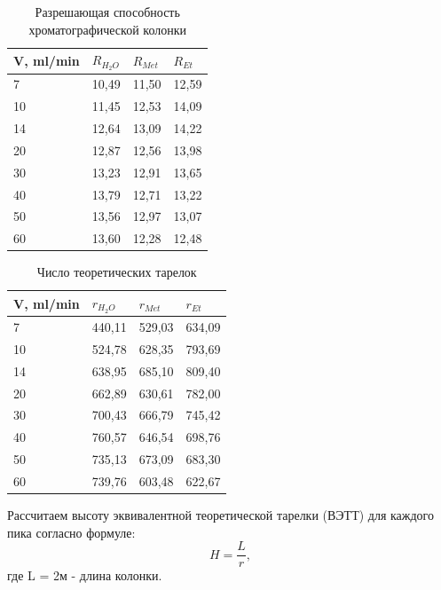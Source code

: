 \documentclass{article}
\begin{document}
 
 \begin{table}[h]
\centering
\begin{tabular}{|l|l|l|l|}
\hline
V, ml/min & $R_{H_2O}$     & $R_{Met}$     & $R_{Et}$     \\ \hline
7            & 10,49 & 11,50 & 12,59 \\ \hline
10           & 11,45 & 12,53 & 14,09 \\ \hline
14           & 12,64 & 13,09 & 14,22 \\ \hline
20           & 12,87 & 12,56 & 13,98 \\ \hline
30           & 13,23 & 12,91 & 13,65 \\ \hline
40           & 13,79 & 12,71 & 13,22 \\ \hline
50           & 13,56 & 12,97 & 13,07 \\ \hline
60           & 13,60 & 12,28 & 12,48 \\ \hline
\end{tabular}
\caption{Разрешающая способность хроматографической колонки}
\label{tab:R}
\end{table}

\begin{table}[h]
\centering
\begin{tabular}{|l|l|l|l|}
\hline
V, ml/min & $r_{H_2O}$     & $r_{Met}$     & $r_{Et}$      \\ \hline
7            & 440,11 & 529,03 & 634,09 \\ \hline
10           & 524,78 & 628,35 & 793,69 \\ \hline
14           & 638,95 & 685,10 & 809,40 \\ \hline
20           & 662,89 & 630,61 & 782,00 \\ \hline
30           & 700,43 & 666,79 & 745,42 \\ \hline
40           & 760,57 & 646,54 & 698,76 \\ \hline
50           & 735,13 & 673,09 & 683,30 \\ \hline
60           & 739,76 & 603,48 & 622,67 \\ \hline
\end{tabular}
\caption{Число теоретических тарелок}
\label{tab:plates}
\end{table}

\par Рассчитаем высоту эквивалентной теоретической тарелки (ВЭТТ) для каждого пика согласно формуле:
$$H = \frac{L}{r},$$
где L = 2м - длина колонки.
\end{document}
